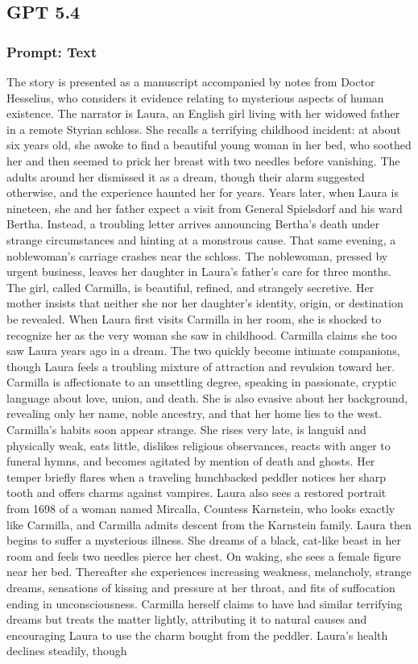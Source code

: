 \documentclass{article} %
\begin{document}
\subsection{GPT 5.4}

\subsubsection{Prompt: Text}

The story is presented as a manuscript accompanied by notes from Doctor Hesselius, who considers it evidence relating to mysterious aspects of human existence. The narrator is Laura, an English girl living with her widowed father in a remote Styrian schloss. She recalls a terrifying childhood incident: at about six years old, she awoke to find a beautiful young woman in her bed, who soothed her and then seemed to prick her breast with two needles before vanishing. The adults around her dismissed it as a dream, though their alarm suggested otherwise, and the experience haunted her for years. Years later, when Laura is nineteen, she and her father expect a visit from General Spielsdorf and his ward Bertha. Instead, a troubling letter arrives announcing Bertha’s death under strange circumstances and hinting at a monstrous cause. That same evening, a noblewoman’s carriage crashes near the schloss. The noblewoman, pressed by urgent business, leaves her daughter in Laura’s father’s care for three months. The girl, called Carmilla, is beautiful, refined, and strangely secretive. Her mother insists that neither she nor her daughter’s identity, origin, or destination be revealed. When Laura first visits Carmilla in her room, she is shocked to recognize her as the very woman she saw in childhood. Carmilla claims she too saw Laura years ago in a dream. The two quickly become intimate companions, though Laura feels a troubling mixture of attraction and revulsion toward her. Carmilla is affectionate to an unsettling degree, speaking in passionate, cryptic language about love, union, and death. She is also evasive about her background, revealing only her name, noble ancestry, and that her home lies to the west. Carmilla’s habits soon appear strange. She rises very late, is languid and physically weak, eats little, dislikes religious observances, reacts with anger to funeral hymns, and becomes agitated by mention of death and ghosts. Her temper briefly flares when a traveling hunchbacked peddler notices her sharp tooth and offers charms against vampires. Laura also sees a restored portrait from 1698 of a woman named Mircalla, Countess Karnstein, who looks exactly like Carmilla, and Carmilla admits descent from the Karnstein family. Laura then begins to suffer a mysterious illness. She dreams of a black, cat-like beast in her room and feels two needles pierce her chest. On waking, she sees a female figure near her bed. Thereafter she experiences increasing weakness, melancholy, strange dreams, sensations of kissing and pressure at her throat, and fits of suffocation ending in unconsciousness. Carmilla herself claims to have had similar terrifying dreams but treats the matter lightly, attributing it to natural causes and encouraging Laura to use the charm bought from the peddler. Laura’s health declines steadily, though 
\end{document}
